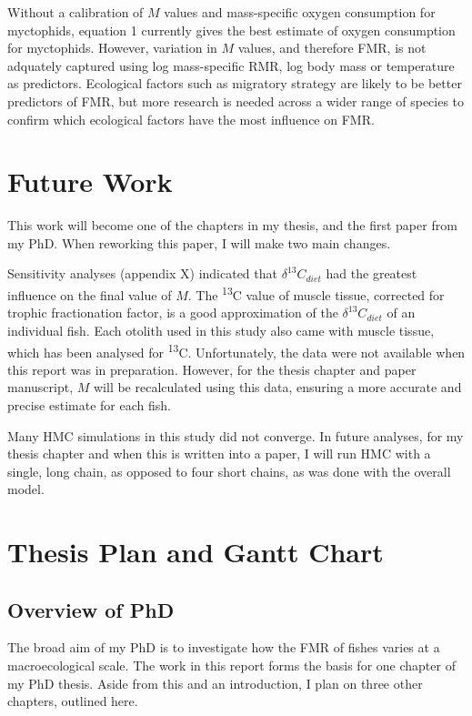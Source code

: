 \documentclass[12pt, titlepage]{article}
\begin{document}
Without a calibration of $M$ values and mass-specific oxygen consumption for myctophids, equation 1 currently gives the best estimate of oxygen consumption for myctophids.
However, variation in $M$ values, and therefore FMR, is not adquately captured using log mass-specific RMR, log body mass or temperature as predictors.
Ecological factors such as migratory strategy are likely to be better predictors of FMR, but more research is needed across a wider range of species to confirm which ecological factors have the most influence on FMR.

\pagebreak
\section{Future Work}

This work will become one of the chapters in my thesis, and the first paper from my PhD.
When reworking this paper, I will make two main changes.

Sensitivity analyses (appendix X) indicated that $\delta^{13}C_{diet}$ had the greatest influence on the final value of $M$. %
The \textdelta \textsuperscript{13}C value of muscle tissue, corrected for trophic fractionation factor, is a good approximation of the $\delta^{13}C_{diet}$ of an individual fish.
Each otolith used in this study also came with muscle tissue, which has been analysed for \textdelta \textsuperscript{13}C.
Unfortunately, the data were not available when this report was in preparation.
However, for the thesis chapter and paper manuscript, $M$ will be recalculated using this data, ensuring a more accurate and precise estimate for each fish.

Many HMC simulations in this study did not converge.
In future analyses, for my thesis chapter and when this is written into a paper, I will run HMC with a single, long chain, as opposed to four short chains, as was done with the overall model.

\pagebreak
\section{Thesis Plan and Gantt Chart}

\subsection{Overview of PhD}

The broad aim of my PhD is to investigate how the FMR of fishes varies at a macroecological scale. The work in this report forms the basis for one chapter of my PhD thesis. Aside from this and an introduction, I plan on three other chapters, outlined here.
\end{document}
